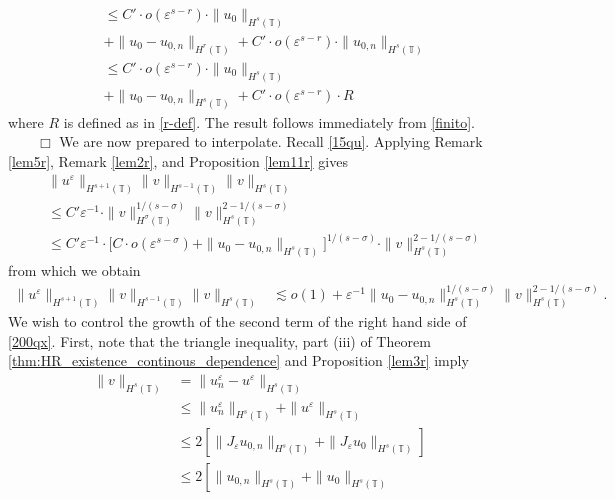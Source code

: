 \documentclass[12pt,reqno]{amsart}
\newcommand{\ci}{\mathbb{T}}
\newcommand{\ee}{\varepsilon}
\theoremstyle{plain}  %
\theoremstyle{definition}
\begin{document}
\begin{appendices}
\begin{equation}
\begin{split}
		& \le
		C' \cdot o(\ee^{s-r}) \cdot \|u_0\|_{H^s(\ci)}
		 \\
		 & + \|u_0 - u_{0,n} \|_{H^r(\ci)} + C' \cdot o (\ee^{s-r}) \cdot
		 \|u_{0,n}\|_{H^s(\ci)}
		 \\
		 & \le
		 C' \cdot o(\ee^{s-r}) \cdot \|u_0\|_{H^s(\ci)}
		 \\
		 & + \|u_0 - u_{0,n} \|_{H^s(\ci)} + C' \cdot o (\ee^{s-r}) \cdot
		 R
	\end{split}
\end{equation}
where $R$ is defined as in \ref{r-def}. The result follows immediately from
\eqref{finito}. $\qquad \Box$
\vskip0.1in
We are now prepared to interpolate. Recall \eqref{15qu}. Applying Remark \ref{lem5r}, Remark \ref{lem2r}, and
Proposition \ref{lem11r} gives
\begin{equation*}
	\begin{split}
		& \|u^\ee \|_{H^{s+1}(\ci)} \|v\|_{H^{s-1}(\ci)} \|v\|_{H^s
		(\ci)}
		\\
		&\le C' \ee^{-1} \cdot \|v\|_{H^\sigma(\ci)}^{1/(s-\sigma)}
		\|v\|_{H^s(\ci)}^{2 - 1/(s- \sigma)}
		\\
		& \le C' \ee^{-1} \cdot \Big [C \cdot o(\ee^{s- \sigma}) + \|u_0 -
		u_{0,n}\|_{H^s(\ci)} \Big ]^{1/(s-\sigma)}
		\cdot \|v\|_{H^s(\ci)}^{2- 1/(s-\sigma)}
	\end{split}
\end{equation*}
from which we obtain
\begin{equation}
	\begin{split}
		\label{200qx}
		\|u^\ee\|_{H^{s+1}(\ci)} \|v\|_{H^{s-1}(\ci)} \|v \|_{H^s(\ci)}
		& \lesssim  o(1) + \ee^{-1}
		\|u_0-u_{0,n}\|_{H^s(\ci)}^{1/(s-\sigma)}\|v\|_{H^s(\ci)}^{2- 1/(s-\sigma)}.
	\end{split}
\end{equation}
We wish to control the growth of the second term of the
right hand side of \eqref{200qx}.
First, note that the triangle inequality, part (iii) of Theorem
\ref{thm:HR_existence_continous_dependence} and Proposition \ref{lem3r} imply
\begin{equation}
	\begin{split}
		\|v\|_{H^s(\ci)} & = \|u^\ee_n - u^\ee \|_{H^s(\ci)} 
		\\
		& \le \|u^\ee_n\|_{H^s(\ci)} + \|u^\ee \|_{H^s(\ci)}  
		\\
		& \le 2\left[  \|J_\ee u_{0,n}\|_{H^s(\ci)} + \|J_\ee u_0 \|_{H^s(\ci)} 
		 \right]
		\\
		& \le 2 \left[ \|u_{0,n} \|_{H^s(\ci)} + \|u_0 \|_{H^s(\ci)} 

\end{split}
\end{equation}
\end{appendices}
\end{document}
